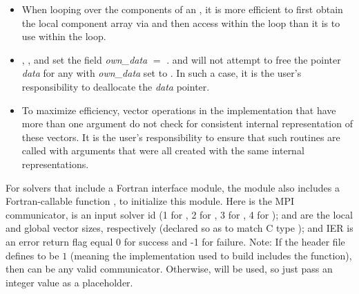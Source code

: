 \begin{itemize}
                                        
\item
  When looping over the components of an  , it is     
  more efficient to first obtain the local component array via       
   and then access  within the     
  loop than it is to use  within the loop.        
                                                               
\item
  {\warn}, , 
  and  set the field 
  {\em own\_data} $=$ . 
   and 
  will not attempt to free the pointer {\em data} for any  with
  {\em own\_data} set to . In such a case, it is the user's responsibility to
  deallocate the {\em data} pointer.

\item
  {\warn}To maximize efficiency, vector operations in the {\nvecph} implementation
  that have more than one  argument do not check for
  consistent internal representation of these vectors. It is the user's 
  responsibility to ensure that such routines are called with 
  arguments that were all created with the same internal representations.

\end{itemize}

For solvers that include a Fortran interface module, the {\nvecph} module
also includes a Fortran-callable function
,
to initialize this {\nvecph} module.  Here  is the MPI communicator,
 is an input solver id (1 for {\cvode}, 2 for {\ida}, 3 for {\kinsol},
4 for {\arkode});  and  are the local and global
vector sizes, respectively (declared so as to match C type );
and IER is an error return flag equal 0 for success and -1 for failure.
{\warn}Note: If the header file  defines
 to be $1$ (meaning the {\mpi}
implementation used to build {\sundials} includes the
 function), then  can be any valid
{\mpi} communicator. Otherwise,  will be used, so
just pass an integer value as a placeholder.
